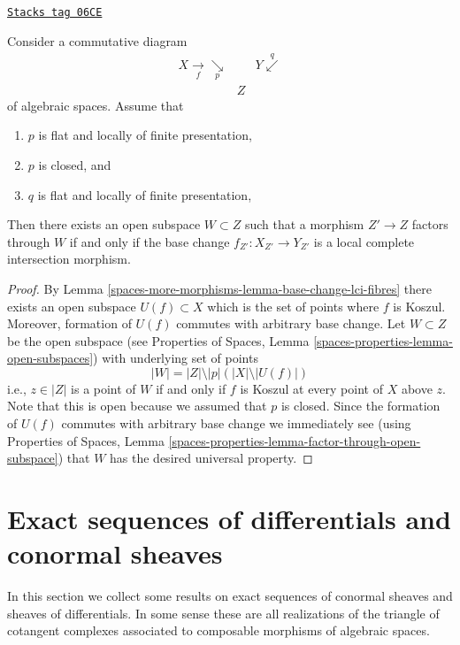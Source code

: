 \begin{lemma}
\label{spaces-more-morphisms-lemma-where-lci}
\href{https://stacks.math.columbia.edu/tag/06CE}{\texttt{Stacks tag 06CE}}

Consider a commutative diagram
$$
\begin{array}{ccc}X \underset{f}{\longrightarrow}\underset{p}{\searrow} &  & Y \overset{q}{\swarrow} \\  & Z & \end{array}
$$
of algebraic spaces. Assume that
\begin{enumerate}
\item $p$ is flat and locally of finite presentation,
\item $p$ is closed, and
\item $q$ is flat and locally of finite presentation,
\end{enumerate}
Then there exists an open subspace $W \subset Z$
such that a morphism $Z' \to Z$ factors through $W$ if and only if the
base change $f_{Z'} : X_{Z'} \to Y_{Z'}$ is a local complete intersection
morphism.
\end{lemma}

\begin{proof}
By Lemma \ref{spaces-more-morphisms-lemma-base-change-lci-fibres}
there exists an open subspace $U(f) \subset X$ which is the set of
points where $f$ is Koszul. Moreover, formation of $U(f)$ commutes
with arbitrary base change. Let $W \subset Z$ be the open subspace
(see
Properties of Spaces, Lemma
\ref{spaces-properties-lemma-open-subspaces})
with underlying set of points
$$
|W| = |Z| \setminus |p|\left(|X| \setminus |U(f)|\right)
$$
i.e., $z \in |Z|$ is a point of $W$ if and only if $f$ is Koszul
at every point of $X$ above $z$. Note that this is open because we
assumed that $p$ is closed. Since the formation of $U(f)$
commutes with arbitrary base change we immediately see (using
Properties of Spaces, Lemma
\ref{spaces-properties-lemma-factor-through-open-subspace})
that $W$ has the desired universal property.
\end{proof}

\section{Exact sequences of differentials and conormal sheaves}
\label{spaces-more-morphisms-section-exact}
In this section we collect some results on exact sequences of conormal
sheaves and sheaves of differentials. In some sense these are all
realizations of the triangle of cotangent complexes associated to
composable morphisms of algebraic spaces.

